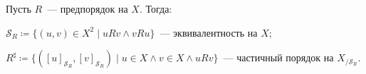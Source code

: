 Пусть $R$~--- предпорядок на $X$. Тогда:
\begin{enumcyr}
    \item $\mathscr{S}_R \coloneqq \{ (u, v) \in X^2 \mid uRv \wedge vRu\}$~--- эквивалентность на $X$;
    \item $R^{\sharp} \coloneqq \{ ([u]_{\mathscr{S}_R}, [v]_{\mathscr{S}_R}) \mid u \in X \wedge v \in X
        \wedge uRv\}$~--- частичный порядок на $X_{/\mathscr{S}_R}$.
\end{enumcyr}
